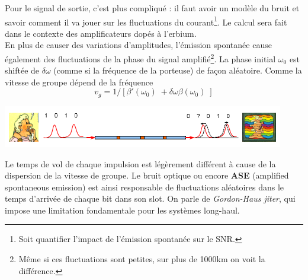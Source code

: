 Pour le signal de sortie, c'est plus compliqué : il faut avoir un modèle du bruit et savoir comment il va jouer sur les fluctuations du courant\footnote{Soit quantifier l'impact de l'émission 
spontanée sur le SNR.}. Le calcul sera fait dans le contexte des amplificateurs dopés à l'erbium.\\

En plus de causer des variations d'amplitudes, l'émission spontanée cause également des fluctuations
de la phase du signal amplifié\footnote{Même si ces fluctuations sont petites, sur plus de 1000km on 
voit la différence. }. La phase initial $\omega_0$ est shiftée de $\delta\omega$ (comme si
la fréquence de la porteuse) de façon aléatoire. Comme la vitesse de groupe dépend de la 
fréquence
\begin{equation}
{v_g} = 1/[\beta '({\omega _0})\; + \delta \omega \beta ({\omega _0})\;]
\end{equation}
\begin{center}
	\includegraphics[scale=0.8]{ch6/image3}
\end{center}
Le temps de vol de chaque impulsion est légèrement différent à cause de la dispersion de la vitesse
de groupe. Le bruit optique ou encore \textbf{ASE} (amplified spontaneous emission) est ainsi 
responsable de fluctuations aléatoires dans le temps d'arrivée de chaque bit dans son slot. On parle
de \textit{Gordon-Haus jiter}, qui impose une limitation fondamentale pour les systèmes long-haul.

\newpage
